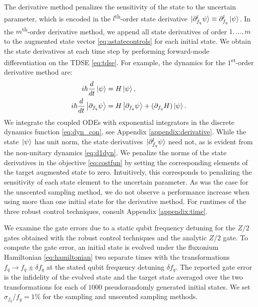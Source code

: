 The derivative method penalizes the sensitivity of the state
to the uncertain parameter, which is encoded in the $l$\textsuperscript{th}-order
state derivative $\ket*{\partial_{f_{q}}^{l} \psi} \equiv \partial_{f_{q}}^{l} \ket*{\psi}$.
In the $m$\textsuperscript{th}-order
derivative method, we append all state derivatives of order $1, \dots, m$
to the augmented state vector \eqref{eq:astatecontrols}
for each initial state.
We obtain the state derivatives at each time step by performing forward-mode
differentiation on the TDSE \eqref{eq:tdse}.
For example, the dynamics for the $1$\textsuperscript{st}-order derivative method are:
\begin{align}
  i \hbar \frac{d}{dt} \ket{\psi} &= H \ket{\psi},\\
  i \hbar \frac{d}{dt} \ket{\partial_{f_{q}}\psi} &=
  H \ket{\partial_{f_{q}} \psi} +
  (\partial_{f_{q}} H) \ket{\psi}.
  \label{eq:d1dyn}
\end{align}
We integrate the coupled ODEs with exponential
integrators in the discrete dynamics function \eqref{eq:dyn_con},
see Appendix \ref{appendix:derivative}.
While the state $\ket*{\psi}$ has unit norm,
the state derivatives $\ket*{\partial^{l}_{f_{q}} \psi}$ need not, as is evident
from the non-unitary dynamics \eqref{eq:d1dyn}.
We penalize the norms of the state derivatives
in the objective \eqref{eq:costfun} by setting the corresponding elements
of the target augmented state to zero. Intuitively, this corresponds to penalizing
the sensitivity of each state element to the uncertain parameter. As was the case for
the unscented sampling
method, we do not observe a performance increase when using more than one initial state
for the derivative method.
For runtimes of the three robust control techniques,
consult Appendix \ref{appendix:time}.

We examine the gate errors due to a static qubit frequency
detuning for the $Z/2$ gates obtained with the robust control techniques
and the analytic $Z/2$ gate.
To compute the gate error,
an initial state is evolved
under the fluxonium Hamiltonian \eqref{eq:hamiltonian}
two separate times with the transformations
$f_{q} \rightarrow f_{q} \pm \delta f_{q}$
at the stated qubit frequency detuning $\delta f_{q}$.
The reported gate error is the infidelity of
the evolved state and the target state averaged over
the two transformations for each of $1000$ pseudorandomly
generated initial states.
We set $\sigma_{f_{q}}/f_{q} = 1\%$
for the sampling and unscented sampling
methods.

